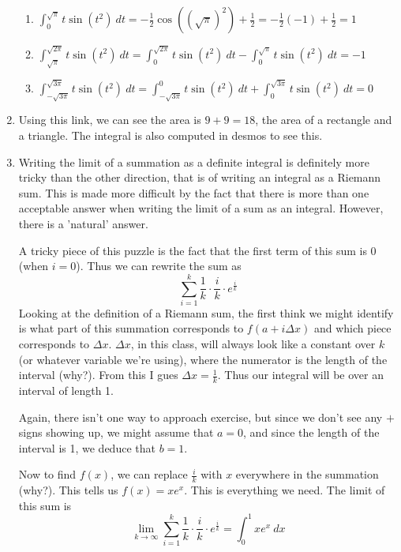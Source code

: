 \documentclass{article}
\begin{document}
\begin{enumerate}
\begin{enumerate}[label=(\roman*)]
    \item $\int_0^{\sqrt{\pi}} t\sin(t^2)\ dt = -\frac{1}{2}\cos((\sqrt{\pi})^2) + \frac{1}{2} = -\frac{1}{2}(-1) + \frac{1}{2} = 1$  
   \item $\int_{\sqrt{\pi}}^{\sqrt{2\pi}} t\sin(t^2)\ dt = \int_{0}^{\sqrt{2\pi}} t\sin(t^2)\ dt-\int_{0}^{\sqrt{\pi}} t\sin(t^2)\ dt=-1$
   \item $\int_{-\sqrt{3\pi}}^{\sqrt{3\pi}} t\sin(t^2)\ dt=\int_{-\sqrt{3\pi}}^{0} t\sin(t^2)\ dt+\int_{0}^{\sqrt{3\pi}} t\sin(t^2)\ dt = 0 $ 
\end{enumerate}
\item Using this link, we can see the area is $9+9=18$, the area of a rectangle and a triangle.  The integral is also computed in desmos to see this.
\item Writing the limit of a summation as a definite integral is definitely more tricky than the other direction, that is of writing an integral as a Riemann sum.  This is made more difficult by the fact that there is more than one acceptable answer when writing the limit of a sum as an integral.  However, there is a 'natural' answer.

A tricky piece of this puzzle is the fact that the first term of this sum is 0 (when $i=0$).  Thus we can rewrite the sum as
\[\sum_{i=1}^k \frac{1}{k} \cdot \frac{i}{k} \cdot e^{\frac{i}{k}}\]
Looking at the definition of a Riemann sum, the first think we might identify is what part of this summation corresponds to $f(a+i\Delta x)$ and which piece corresponds to $\Delta x$.  $\Delta x$, in this class, will always look like a constant over $k$ (or whatever variable we're using), where the numerator is the length of the interval (why?).  From this I gues $\Delta x = \frac{1}{k}$.  Thus our integral will be over an interval of length 1.

Again, there isn't one way to approach exercise, but since we don't see any $+$ signs showing up, we might assume that $a=0$, and since the length of the interval is 1, we deduce that $b=1$.  

Now to find $f(x)$, we can replace $\frac{i}{k}$ with $x$ everywhere in the summation (why?).  This tells us $f(x) = xe^x$.  This is everything we need.  The limit of this sum is
\[\lim_{k\to \infty} \sum_{i=1}^k \frac{1}{k} \cdot \frac{i}{k} \cdot e^{\frac{i}{k}} = \int_0^1 xe^x\ dx\]
    \end{enumerate}
\end{document}
